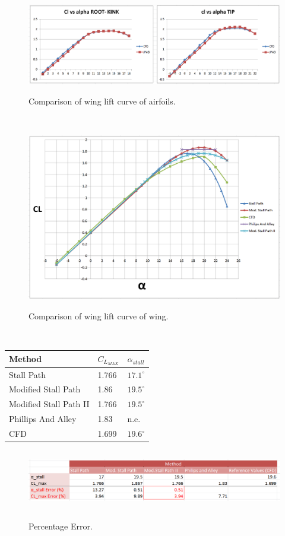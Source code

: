\begin{figure}[H]
	\centering
	{\includegraphics[height=4.9 cm]{Immagini/comparisonairfoil.png}} 
	\caption{Comparison of wing lift curve of airfoils.}
	\label{fig:met}
\end{figure}
	 	 
\noindent \\

	 	 
\begin{figure}[H]
	\centering
	{\includegraphics[height=9.9 cm]{Immagini/clmaxcomparison1.png}} 
	\caption{Comparison of wing lift curve of wing.}
	\label{fig:met}
\end{figure}
	 	 
	 	 
\noindent \\
\begin{center}
	\begin{tabular}{| l | l | l | }
		\hline
		 Method  & $C_{L_{MAX}}$ & $\alpha_{stall}$   \\ \hline
		 Stall Path  &1.766  & $17.1 ^{\circ}$  \\ \hline
		 Modified Stall Path  & 1.86   & $19.5^{\circ}$  \\ \hline
		 Modified Stall Path II  & 1.766  & $19.5^{\circ}$  \\ \hline
		 Phillips And Alley  & 1.83  & n.e.\\ \hline
		 CFD  & 1.699  & $19.6 ^{\circ}$   \\ \hline
		\hline
	\end{tabular}
\end{center}

\begin{figure}[H]
	\centering
	{\includegraphics[height=2.63cm]{Immagini/referencepercent.png}} 
	\caption{Percentage Error.}
	\label{fig:met}
\end{figure}

